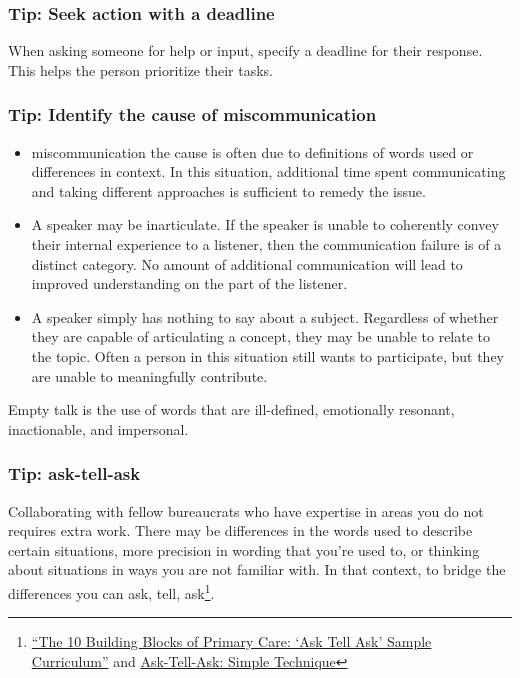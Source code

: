 \subsubsection{Tip: Seek action with a deadline}

When asking someone for help or input, specify a deadline for their response. This helps the person prioritize their tasks.

\subsubsection{Tip: Identify the cause of miscommunication}

\begin{itemize}
    \item miscommunication the cause is often due to definitions of words used or differences in context. In this situation, additional time spent communicating and taking different approaches is sufficient to remedy the issue.
\item A speaker may be inarticulate. If the speaker is unable to coherently convey their internal experience to a listener, then the communication failure is of a distinct category. No amount of additional communication will lead to improved understanding on the part of the listener.
\item A speaker simply has nothing to say about a subject. Regardless of whether they are capable of articulating a concept, they may be unable to relate to the topic. Often a person in this situation still wants to participate, but they are unable to meaningfully contribute. 
\end{itemize}
Empty talk is the use of words that are ill-defined, emotionally resonant, inactionable, and impersonal.

\subsubsection{Tip: ask-tell-ask}

Collaborating with fellow bureaucrats who have expertise in areas you do not requires extra work. There may be differences in the words used to describe certain situations, more precision in wording that you're used to, or thinking about situations in ways you are not familiar with. In that context, to bridge the differences you can ask, tell, ask\footnote{\href{https://cepc.ucsf.edu/sites/cepc.ucsf.edu/files/Curriculum_sample_14-0602.pdf}{``The 10 Building Blocks of Primary Care: `Ask Tell Ask' Sample Curriculum''} and \href{https://www.the-hospitalist.org/hospitalist/article/125126/qi-initiatives/ask-tell-ask-simple-technique-can-help-hospitalists}{Ask-Tell-Ask: Simple Technique}}. 

